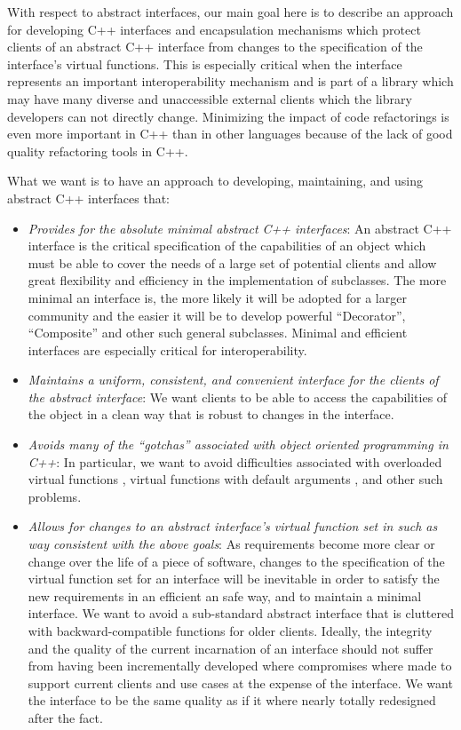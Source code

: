 \documentclass[pdf,ps2pdf,11pt]{SANDreport}
\begin{document}
With respect to abstract interfaces, our main goal here is to describe an
approach for developing C++ interfaces and encapsulation mechanisms which
protect clients of an abstract C++ interface from changes to the specification
of the interface's virtual functions.  This is especially critical when the
interface represents an important interoperability mechanism and is part of a
library which may have many diverse and unaccessible external clients which
the library developers can not directly change.  Minimizing the impact of code
refactorings is even more important in C++ than in other languages because of
the lack of good quality refactoring tools in C++.

What we want is to have an approach to developing, maintaining, and using
abstract C++ interfaces that:

\begin{itemize}

{}\item\textit{Provides for the absolute minimal abstract C++ interfaces}: An
abstract C++ interface is the critical specification of the capabilities of an
object which must be able to cover the needs of a large set of potential
clients and allow great flexibility and efficiency in the implementation of
subclasses.  The more minimal an interface is, the more likely it will be
adopted for a larger community and the easier it will be to develop powerful
``Decorator'', ``Composite'' and other such general subclasses.  Minimal and
efficient interfaces are especially critical for interoperability.

{}\item\textit{Maintains a uniform, consistent, and convenient interface for
the clients of the abstract interface}: We want clients to be able to access
the capabilities of the object in a clean way that is robust to changes in the
interface.

{}\item\textit{Avoids many of the ``gotchas'' associated with object oriented
programming in C++}: In particular, we want to avoid difficulties associated
with overloaded virtual functions {}\cite[Item 73]{C++Gotchas03}, virtual
functions with default arguments {}\cite[Item 37]{EffectiveC++3rd}, and other
such problems.

{}\item\textit{Allows for changes to an abstract interface's virtual function
set in such as way consistent with the above goals}: As requirements become
more clear or change over the life of a piece of software, changes to the
specification of the virtual function set for an interface will be inevitable
in order to satisfy the new requirements in an efficient an safe way, and to
maintain a minimal interface.  We want to avoid a sub-standard abstract
interface that is cluttered with backward-compatible functions for older
clients.  Ideally, the integrity and the quality of the current incarnation of
an interface should not suffer from having been incrementally developed where
compromises where made to support current clients and use cases at the expense
of the interface.  We want the interface to be the same quality as if it where
nearly totally redesigned after the fact.


\end{itemize}
\end{document}
